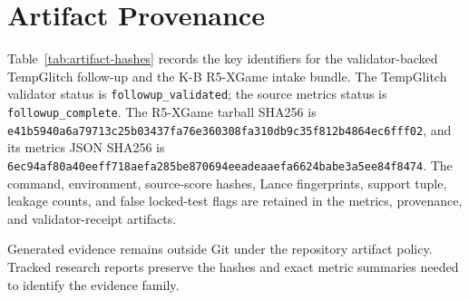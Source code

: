 \section{Artifact Provenance}
\label{app:artifact-provenance}

Table~\ref{tab:artifact-hashes} records the key identifiers for the validator-backed TempGlitch
follow-up and the K-B R5-XGame intake bundle. The TempGlitch validator status is
\texttt{followup\_validated}; the source metrics status is \texttt{followup\_complete}. The
R5-XGame tarball SHA256 is
\texttt{e41b5940a6a79713c25b03437fa76e360308fa310db9c35f812b4864ec6fff02}, and its metrics
JSON SHA256 is
\texttt{6ec94af80a40eeff718aefa285be870694eeadeaaefa6624babe3a5ee84f8474}. The command,
environment, source-score hashes, Lance fingerprints, support tuple, leakage counts, and false
locked-test flags are retained in the metrics, provenance, and validator-receipt artifacts.



Generated evidence remains outside Git under the repository artifact policy. Tracked research
reports preserve the hashes and exact metric summaries needed to identify the evidence family.
